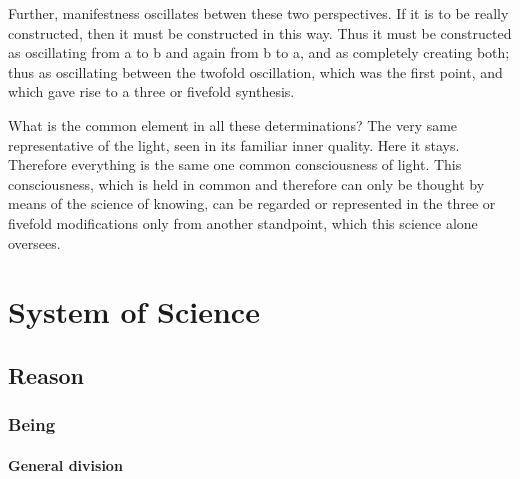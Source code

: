 \documentclass{article}
\begin{document}
Further, manifestness oscillates betwen these two perspectives.
If it is to be really constructed, then it must be constructed in this way.
Thus it must be constructed as oscillating from a to b and again from b to a,
and as completely creating both;
thus as oscillating between the twofold oscillation,
which was the first point, and which gave rise to a
three or fivefold synthesis.

What is the common element in all these determinations?
The very same representative of the light, seen in its familiar inner quality.
Here it stays. Therefore everything is the same one common consciousness of light.
This consciousness, which is held in common and therefore can only be thought
by means of the science of knowing, can be regarded or represented in
the three or fivefold  modifications only from another standpoint, 
which this science alone oversees.

\section{System of Science}
\subsection{Reason}

\subsubsection{Being}

\paragraph{General division} 
\end{document}

